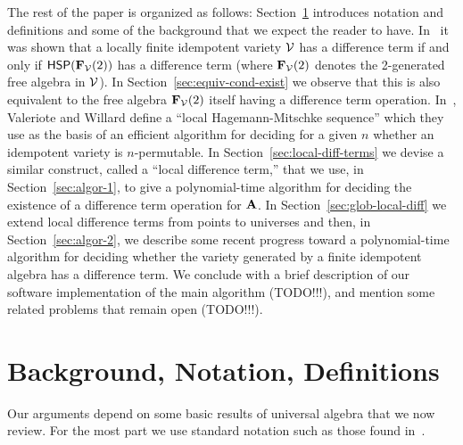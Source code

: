 The rest of the paper is organized as follows:
Section~\ref{sec:definitions} introduces notation and definitions and some of
the background that we expect the reader to have.
In~\cite{MR1358491}
it was shown that a locally finite idempotent variety $\mathcal{V}$ has a difference
term if and only if $\mathsf{H} \mathsf{S} \mathsf{P}(\mathbf{F}_{\mathcal{V}}(2))$
has a difference term (where $\mathbf{F}_{\mathcal{V}}(2)$ denotes the 2-generated free algebra in $\mathcal{V}$).
In Section~\ref{sec:equiv-cond-exist}
we observe that this is also equivalent to
the free algebra $\mathbf{F}_{\mathcal{V}}(2)$ itself having a difference term operation.
In~\cite{MR3239624},
Valeriote and Willard define
a ``local Hagemann-Mitschke sequence'' which they use as the basis of
an efficient algorithm for deciding for a given $n$ whether an idempotent
variety is $n$-permutable.
In Section~\ref{sec:local-diff-terms}
we devise a similar construct, called
a ``local difference term,'' that we use, in Section~\ref{sec:algor-1},
to give a polynomial-time algorithm for deciding the existence of a difference term
operation for $\mathbf{A}$.  In Section~\ref{sec:glob-local-diff} we extend local
difference terms from points to universes and then, in
Section~\ref{sec:algor-2}, we describe some recent progress toward a polynomial-time
algorithm for deciding whether the variety generated by a finite idempotent algebra has a
difference term. We conclude with a brief description of our software
implementation of the main algorithm (TODO!!!), and mention some related
problems that remain open (TODO!!!).


\section{Background, Notation, Definitions}
\label{sec:definitions}
Our arguments depend on some basic results of universal algebra that we now review.
For the most part we use standard notation such as those found in~\cite{MR2839398}.

